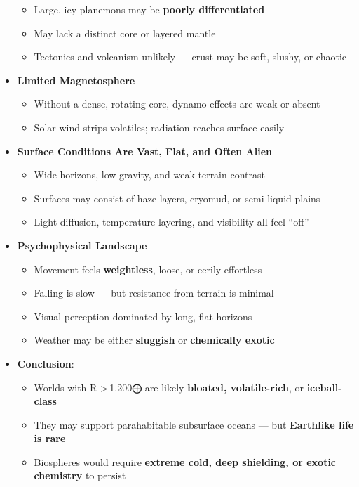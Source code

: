 \documentclass[
  letterpaper,
]{book}
\providecommand{\tightlist}{%
  \setlength{\itemsep}{0pt}\setlength{\parskip}{0pt}}
\begin{document}
\begin{itemize}
  \begin{itemize}
  \tightlist
  \item
    Large, icy planemons may be \textbf{poorly differentiated}
  \item
    May lack a distinct core or layered mantle
  \item
    Tectonics and volcanism unlikely --- crust may be soft, slushy, or
    chaotic
  \end{itemize}
\item
  \textbf{Limited Magnetosphere}

  \begin{itemize}
  \tightlist
  \item
    Without a dense, rotating core, dynamo effects are weak or absent
  \item
    Solar wind strips volatiles; radiation reaches surface easily
  \end{itemize}
\item
  \textbf{Surface Conditions Are Vast, Flat, and Often Alien}

  \begin{itemize}
  \tightlist
  \item
    Wide horizons, low gravity, and weak terrain contrast
  \item
    Surfaces may consist of haze layers, cryomud, or semi-liquid plains
  \item
    Light diffusion, temperature layering, and visibility all feel
    ``off''
  \end{itemize}
\item
  \textbf{Psychophysical Landscape}

  \begin{itemize}
  \tightlist
  \item
    Movement feels \textbf{weightless}, loose, or eerily effortless
  \item
    Falling is slow --- but resistance from terrain is minimal
  \item
    Visual perception dominated by long, flat horizons
  \item
    Weather may be either \textbf{sluggish} or \textbf{chemically
    exotic}
  \end{itemize}
\item
  \textbf{Conclusion}:

  \begin{itemize}
  \tightlist
  \item
    Worlds with R \textgreater\,1.200⨁ are likely \textbf{bloated,
    volatile-rich}, or \textbf{iceball-class}
  \item
    They may support parahabitable subsurface oceans --- but
    \textbf{Earthlike life is rare}
  \item
    Biospheres would require \textbf{extreme cold, deep shielding, or
    exotic chemistry} to persist
  \end{itemize}
\end{itemize}
\end{document}
